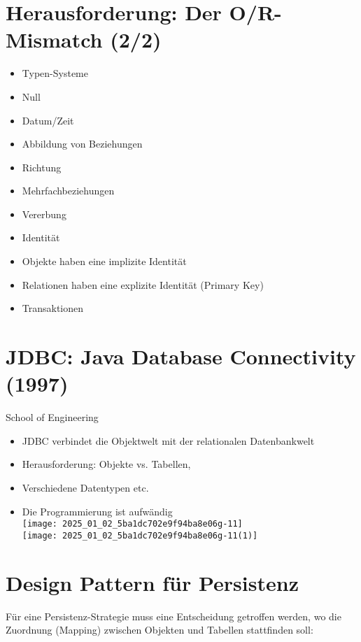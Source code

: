 \section*{Herausforderung: Der O/R-Mismatch (2/2)}
\begin{itemize}
  \item Typen-Systeme
  \item Null
  \item Datum/Zeit
  \item Abbildung von Beziehungen
  \item Richtung
  \item Mehrfachbeziehungen
  \item Vererbung
  \item Identität
  \item Objekte haben eine implizite Identität
  \item Relationen haben eine explizite Identität (Primary Key)
  \item Transaktionen
\end{itemize}

\section*{JDBC: Java Database Connectivity (1997)}
School of Engineering

\begin{itemize}
  \item JDBC verbindet die Objektwelt mit der relationalen Datenbankwelt
  \item Herausforderung: Objekte vs. Tabellen,
  \item Verschiedene Datentypen etc.
  \item Die Programmierung ist aufwändig\\
\texttt{[image: 2025\_01\_02\_5ba1dc702e9f94ba8e06g-11]}\\
\texttt{[image: 2025\_01\_02\_5ba1dc702e9f94ba8e06g-11(1)]}
\end{itemize}

\section*{Design Pattern für Persistenz}
Für eine Persistenz-Strategie muss eine Entscheidung getroffen werden, wo die Zuordnung (Mapping) zwischen Objekten und Tabellen stattfinden soll:

